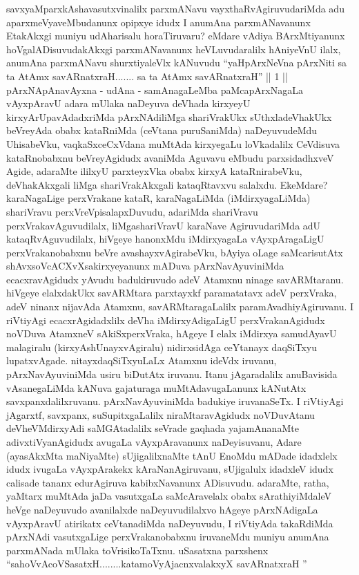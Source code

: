 \begin{artha}
savxyaMparxkAshavasutxvinalilx parxmANavu vayxthaRvAgiruvudariMda adu aparxmeVyaveMbudanunx opipxye idudx I anumAna parxmANavanunx EtakAkxgi muniyu udAharisalu horaTiruvaru? eMdare \mdash  vAdiya BArxMtiyanunx hoVgalADisuvudakAkxgi parxmANavanunx heVLuvudaralilx hAniyeVnU ilalx, anumAna parxmANavu shurxtiyaleVlx kANuvudu \mdash  ``yaHpArxNeVna pArxNiti sa ta AtAmx savARnatxraH....... sa ta AtAmx savARnatxraH'' || 1 || pArxNApAnavAyxna - udAna - samAnagaLeMba paMcapArxNagaLa vAyxpAravU adara mUlaka naDeyuva deVhada kirxyeyU kirxyArUpavAdadxriMda pArxNAdiliMga shariVrakUkx sUthxladeVhakUkx beVreyAda obabx kataRniMda (ceVtana puruSaniMda) naDeyuvudeMdu UhisabeVku, vaqkaSxceCxVdana muMtAda kirxyegaLu loVkadalilx CeVdisuva kataRnobabxnu beVreyAgidudx avaniMda Aguvavu eMbudu parxsidadhxveV Agide, adaraMte ililxyU parxteyxVka obabx kirxyA kataRnirabeVku, deVhakAkxgali liMga shariVrakAkxgali kataqRtavxvu salalxdu. EkeMdare? karaNagaLige perxVrakane kataR, karaNagaLiMda (iMdirxyagaLiMda) shariVravu perxVreVpisalapxDuvudu, adariMda shariVravu perxVrakavAguvudilalx, liMgashariVravU karaNave AgiruvudariMda adU kataqRvAguvudilalx, hiVgeye hanonxMdu iMdirxyagaLa vAyxpAragaLigU perxVrakanobabxnu beVre avashayxvAgirabeVku, bAyiya oLage saMcarisutAtx shAvxsoVcACXvXsakirxyeyanunx mADuva pArxNavAyuviniMda ecacxravAgidudx yAvudu badukiruvudo adeV Atamxnu ninage savARMtaranu. hiVgeye elalxdakUkx savARMtara parxtayxkf paramatatavx adeV perxVraka, adeV ninanx nijavAda Atamxnu, savARMtaragaLalilx paramAvadhiyAgiruvanu. I riVtiyAgi ecacxrAgidadxlilx deVha iMdirxyAdigaLigU perxVrakanAgidudx noVDuva AtamxneV sAkiSxperxVraka, hAgeye I elalx iMdirxya samudAyavU malagiralu (kirxyAshUnayxvAgiralu) nidirxsidAga ceYtanayx daqSiTxyu lupatxvAgade. nitayxdaqSiTxyuLaLx Atamxnu ideVdx iruvanu, pArxNavAyuviniMda usiru biDutAtx iruvanu. Itanu jAgaradalilx anuBavisida vAsanegaLiMda kANuva gajaturaga muMtAdavugaLanunx kANutAtx savxpanxdalilxruvanu. pArxNavAyuviniMda badukiye iruvanaSeTx. I riVtiyAgi jAgarxtf, savxpanx, suSupitxgaLalilx niraMtaravAgidudx noVDuvAtanu deVheVMdirxyAdi saMGAtadalilx seVrade gaqhada yajamAnanaMte adivxtiVyanAgidudx avugaLa vAyxpAravanunx naDeyisuvanu, Adare (ayasAkxMta maNiyaMte) sUjigalilxnaMte tAnU EnoMdu mADade idadxlelx idudx ivugaLa vAyxpArakekx kAraNanAgiruvanu, sUjigalulx idadxleV idudx calisade tananx edurAgiruva kabibxNavanunx ADisuvudu. adaraMte, ratha, yaMtarx muMtAda jaDa vasutxgaLa saMcAravelalx obabx sArathiyiMdaleV heVge naDeyuvudo avanilalxde naDeyuvudilalxvo hAgeye pArxNAdigaLa vAyxpAravU atirikatx ceVtanadiMda naDeyuvudu, I riVtiyAda takaRdiMda pArxNAdi vasutxgaLige perxVrakanobabxnu iruvaneMdu muniyu anumAna parxmANada mUlaka toVrisikoTaTxnu. uSasatxna parxshenx \ndash  ``sahoVvAcoVSasatxH........katamoVyAjacnxvalakxyX savARnatxraH ''
\end{artha}

